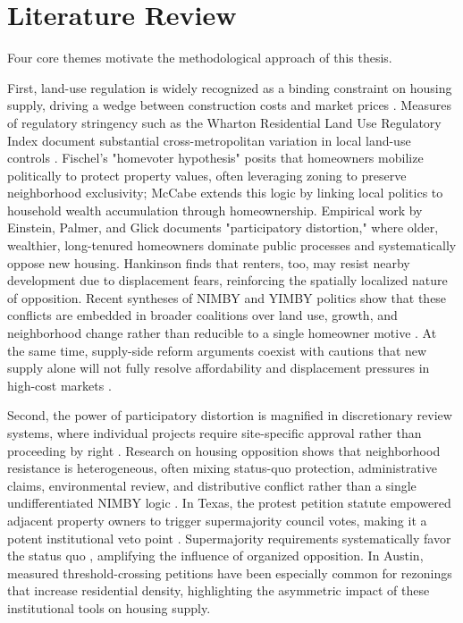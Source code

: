 \documentclass[11pt, letterpaper, oneside]{article}
\begin{document}
\section{Literature Review}

Four core themes motivate the methodological approach of this thesis.

First, land-use regulation is widely recognized as a binding constraint on housing supply, driving a wedge between construction costs and market prices \cite{glaeser2005manhattan, glaeser2003zoning, gyourko2015regulation,quigley2005effects}. Measures of regulatory stringency such as the Wharton Residential Land Use Regulatory Index document substantial cross-metropolitan variation in local land-use controls \cite{gyourko2008wrluri,gyourko2021local}. Fischel's "homevoter hypothesis" \cite{fischel2001homevoter} posits that homeowners mobilize politically to protect property values, often leveraging zoning to preserve neighborhood exclusivity; McCabe \cite{mccabe2016} extends this logic by linking local politics to household wealth accumulation through homeownership. Empirical work by Einstein, Palmer, and Glick \cite{einstein2019book} documents "participatory distortion," where older, wealthier, long-tenured homeowners dominate public processes and systematically oppose new housing. Hankinson \cite{hankinson2018} finds that renters, too, may resist nearby development due to displacement fears, reinforcing the spatially localized nature of opposition. Recent syntheses of NIMBY and YIMBY politics show that these conflicts are embedded in broader coalitions over land use, growth, and neighborhood change rather than reducible to a single homeowner motive \cite{brouwer2024nimbys}. At the same time, supply-side reform arguments coexist with cautions that new supply alone will not fully resolve affordability and displacement pressures in high-cost markets \cite{hamilton2023reform,been2019supply}.

Second, the power of participatory distortion is magnified in discretionary review systems, where individual projects require site-specific approval rather than proceeding by right \cite{manville2016unpermitted, hills2011zoning}. Research on housing opposition shows that neighborhood resistance is heterogeneous, often mixing status-quo protection, administrative claims, environmental review, and distributive conflict rather than a single undifferentiated NIMBY logic \cite{pendall1999opposition,schively2007nimby}. In Texas, the protest petition statute empowered adjacent property owners to trigger supermajority council votes, making it a potent institutional veto point \cite{texas211006,furth2023invisible}. Supermajority requirements systematically favor the status quo \cite{cellini2010schools}, amplifying the influence of organized opposition. In Austin, measured threshold-crossing petitions have been especially common for rezonings that increase residential density, highlighting the asymmetric impact of these institutional tools on housing supply.
\end{document}
